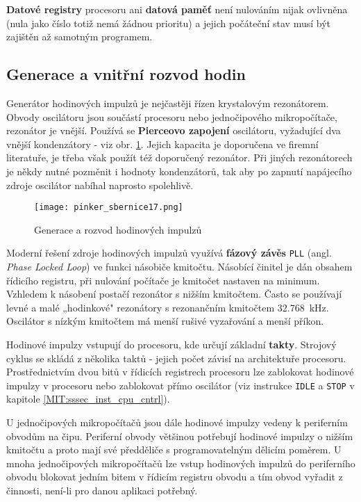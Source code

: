       \textbf{Datové registry} procesoru ani \textbf{datová paměť} není nulováním nijak ovlivněna 
      (nula jako číslo totiž nemá žádnou prioritu) a jejich počáteční stav musí být zajištěn až 
      samotným programem.

    \subsection{Generace a vnitřní rozvod hodin}\label{MIT:chap_clkgen}
      Generátor hodinových impulzů je nejčastěji řízen krystalovým rezonátorem. Obvody oscilátoru 
      jsou součástí procesoru nebo jednočipového mikropočítače, rezonátor je vnější. Používá se 
      \textbf{Pierceovo zapojení} oscilátoru, vyžadující dva vnější kondenzátory - viz obr. 
      \ref{MIT:fig_sbernice17}. Jejich kapacita je doporučena ve firemní literatuře, je třeba však 
      použít též doporučený rezonátor. Při jiných rezonátorech je někdy nutné pozměnit i hodnoty 
      kondenzátorů, tak aby po zapnutí napájecího zdroje oscilátor nabíhal naprosto spolehlivě.
      
      \begin{figure}[ht!] %
        \centering
        \texttt{[image: pinker\_sbernice17.png]}
        \caption{Generace a rozvod hodinových impulzů}
        \label{MIT:fig_sbernice17}
      \end{figure}
      
      Moderní řešení zdroje hodinových impulzů využívá \textbf{fázový závěs} \texttt{PLL} (angl. 
      \emph{Phase Locked Loop}) ve funkci násobiče kmitočtu. Násobící činitel je dán obsahem 
      řídicího registru, při nulování počítače je kmitočet nastaven na minimum. Vzhledem k násobení 
      postačí rezonátor s nižším kmitočtem. Často se používají levné a malé „hodinkové" rezonátory 
      s rezonančním kmitočtem \SI{32.768}{\kilo\hertz}. Oscilátor s nízkým kmitočtem má menší 
      rušivé vyzařování a menší příkon.
      
      Hodinové impulzy vstupují do procesoru, kde určují základní \textbf{takty}. Strojový cyklus 
      se skládá z několika taktů - jejich počet závisí na architektuře procesoru. Prostřednictvím 
      dvou bitů v řídicích registrech procesoru lze zablokovat hodinové impulzy v procesoru nebo 
      zablokovat přímo oscilátor (viz instrukce \texttt{IDLE} a \texttt{STOP} v kapitole 
      \ref{MIT:sssec_inst_cpu_cntrl}). 
      
      U jednočipových mikropočítačů jsou dále hodinové impulzy vedeny k periferním obvodům na čipu. 
      Periferní obvody většinou potřebují hodinové impulzy o nižším kmitočtu a proto mají své 
      předděliče s programovatelným dělicím poměrem. U mnoha jednočipových mikropočítačů lze vstup 
      hodinových impulzů do periferního obvodu blokovat jedním bitem v řídicím registru obvodu a 
      tím obvod vyřadit z činnosti, není-li pro danou aplikaci potřebný.
      
